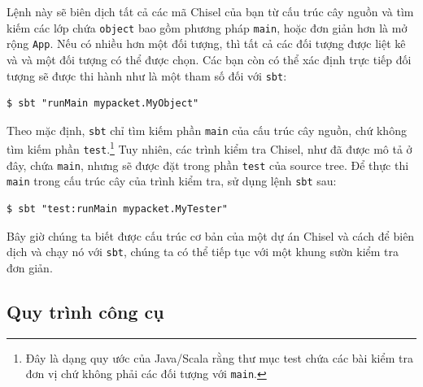 \documentclass[%
    10pt,
    headinclude, footexclude,
    openright, %
    notitlepage,
    cleardoubleempty,
    headsepline,
    pointlessnumbers,
    bibtotoc, idxtotoc,
    ]{scrbook}
\newcommand{\code}[1]{{\small{\texttt{#1}}}}
\newcommand{\codefoot}[1]{{\footnotesize{\texttt{#1}}}}
\begin{document}
Lệnh này sẽ biên dịch tất cả các mã Chisel của bạn từ cấu trúc cây nguồn và tìm kiếm các lớp chứa
\code{object} bao gồm phương pháp \code{main}, hoặc đơn giản hơn là mở rộng \code{App}. 
Nếu có nhiều hơn một đối tượng, thì tất cả các đối tượng được liệt kê và và một đối tượng có thể được chọn.
Các bạn còn có thể xác định trực tiếp đối tượng sẽ được thi hành như là một tham số đối với \code{sbt}:

\begin{verbatim}
$ sbt "runMain mypacket.MyObject"
\end{verbatim}

Theo mặc định, \code{sbt} chỉ tìm kiếm phần \code{main} của cấu trúc cây nguồn, chứ không tìm kiếm phần
\code{test}.\footnote{Đây là dạng quy ước của Java/Scala rằng thư mục test chứa 
các bài kiểm tra đơn vị chứ không phải các đối tượng với \codefoot{main}.} Tuy nhiên, các trình kiểm tra Chisel, 
như đã được mô tả ở đây, chứa \code{main}, nhưng sẽ được đặt trong phần \code{test} của source tree.
Để thực thi \code{main} trong cấu trúc cây của trình kiểm tra, sử dụng lệnh \code{sbt} sau:

\begin{verbatim}
$ sbt "test:runMain mypacket.MyTester"
\end{verbatim}

Bây giờ chúng ta biết được cấu trúc cơ bản của một dự án Chisel và cách để biên dịch và chạy nó
với \code{sbt}, chúng ta có thể tiếp tục với một khung sườn kiểm tra đơn giản.

\subsection{Quy trình công cụ}
\end{document}
